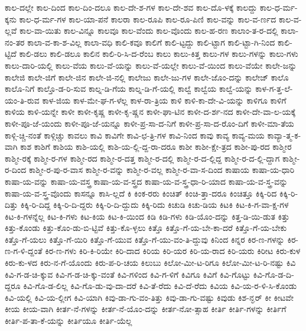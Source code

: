 {ಕಾಲ-ದಲ್ಲೇ
ಕಾಲ-ದಿಂದ
ಕಾಲ-ದಿಂ-ದಲೂ
ಕಾಲ-ದೇ-ಶ-ಗಳ
ಕಾಲ-ದೇ-ಶವ
ಕಾಲ-ದೊ-ಳಕ್ಕೆ
ಕಾಲದ್ದು
ಕಾಲ-ಧ-ರ್ಮ-ಕ್ಕನು
ಕಾಲ-ಧ-ರ್ಮ-ಗಳ
ಕಾಲ-ಯಾ-ಪನೆ
ಕಾಲರಾ
ಕಾಲ-ರೂಪಿ
ಕಾಲ-ರೂ-ಪಿಣಿ
ಕಾಲ-ವನ್ನು
ಕಾಲ-ವ-ರ್ಣದ
ಕಾಲ-ವ-ಲ್ಲವೆ
ಕಾಲ-ವಾ-ಯಿತು
ಕಾಲ-ವಿನ್ನೂ
ಕಾಲವೂ
ಕಾಲ-ವೆಂದು
ಕಾಲ-ವೊಂದು
ಕಾಲ-ಹ-ರಣ
ಕಾಲಾಂ-ತ-ರ-ದಲ್ಲಿ
ಕಾಲಾ-ನಂ-ತರ
ಕಾಲಾ-ವ-ಕಾ-ಶ-ವಿಲ್ಲ
ಕಾಲಾ-ವಧಿ
ಕಾಲಿ-ಕವೂ
ಕಾಲಿಗೆ
ಕಾಲಿ-ಟ್ಟದ್ದು
ಕಾಲಿ-ಟ್ಟಾಗ
ಕಾಲಿ-ಟ್ಟಾ-ಗಿ-ನಿಂದ
ಕಾಲಿ-ಟ್ಟಿದೆ
ಕಾಲಿ-ಡಲು
ಕಾಲಿ-ಡಲೂ
ಕಾಲಿನ
ಕಾಲಿ-ರಿ-ಸಿ-ದ-ರೆಂಬ
ಕಾಲು
ಕಾಲು-ಕಿತ್ತ
ಕಾಲು-ಗಳ
ಕಾಲು-ಗಳನ್ನು
ಕಾಲು-ಗಳು
ಕಾಲು-ದಾರಿ-ಯಲ್ಲಿ
ಕಾಲು-ವೆಯ
ಕಾಲು-ವೆ-ಯನ್ನು
ಕಾಲು-ವೆ-ಯಲ್ಲೇ
ಕಾಲು-ವೆ-ಯಿಂದ
ಕಾಲು-ವೆಯೇ
ಕಾಲೇ-ಜನ್ನು
ಕಾಲೇಜಿ
ಕಾಲೇ-ಜಿಗೆ
ಕಾಲೇ-ಜಿನ
ಕಾಲೇ-ಜಿ-ನಲ್ಲಿ
ಕಾಲೇಜು
ಕಾಲೇ-ಜು-ಗಳ
ಕಾಲೇ-ಜೊಂ-ದನ್ನು
ಕಾಲೇಜ್
ಕಾಲೊ
ಕಾಲೊ-ನಿಗೆ
ಕಾಲ್ತೊ-ಡ-ರಿ-ಸುವ
ಕಾಲ್ನ-ಡಿ-ಗೆಯ
ಕಾಲ್ನ-ಡಿ-ಗೆ-ಯಲ್ಲಿ
ಕಾಲ್ವೆ
ಕಾಲ್ವೆಯ
ಕಾಲ್ವೆ-ಯನ್ನು
ಕಾಳ-ಗ-ತ್ತ-ಲೆ-ಯಂ-ತಿ-ರುವ
ಕಾಳ-ಜಿಯ
ಕಾಳ-ಮೇ-ಘ-ಗ-ಳೆಲ್ಲ
ಕಾಳ-ರಾ-ತ್ರಿಯ
ಕಾಳಿ
ಕಾಳಿ-ಕಾ-ದೇ-ವಿ-ಯನ್ನು
ಕಾಳಿಗೂ
ಕಾಳಿಗೆ
ಕಾಳಿಯ
ಕಾಳಿ-ಯನ್ನೇ
ಕಾಳೀ
ಕಾಳೀ-ಕೃಷ್ಣ
ಕಾಳೀ-ಕೃ-ಷ್ಣನ
ಕಾಳೀ-ಘಾ-ಟಿನ
ಕಾಳೀ-ದ-ರ್ಶ-ನದ
ಕಾಳೀ-ದೇ-ವಾ-ಲ-ಯಕ್ಕೆ
ಕಾಳೀ-ಪೂ-ಜೆ-ಯಂದು
ಕಾಳೀ-ಪೂ-ಜೆ-ಯನ್ನೂ
ಕಾಳೀ-ಪ್ರ-ಸಾ-ದ-ನಿಗೆ
ಕಾಳೀ-ಪ್ರ-ಸಾ-ದ-ರೊಂ-ದಿಗೆ
ಕಾಳೀ-ಮಾ-ತೆಯ
ಕಾಳ್ಗಿ-ಚ್ಚಿ-ನಂತೆ
ಕಾಳ್ಗಿಚ್ಚು
ಕಾವಲು
ಕಾವಿ
ಕಾವಿಗೇ
ಕಾವಿ-ಛ-ತ್ರಿ-ಗಳ
ಕಾವಿ-ನಿಂದ
ಕಾವು
ಕಾವ್ಯ
ಕಾವ್ಯ-ಮಯ
ಕಾವ್ಯಾ-ತ್ಮ-ಕ-ವಾಗಿ
ಕಾಶ
ಕಾಶಿಗೆ
ಕಾಶಿಯ
ಕಾಶಿ-ಯಲ್ಲಿ
ಕಾಶಿ-ಯ-ಲ್ಲಿ-ದ್ದ-ರಾ-ದರೂ
ಕಾಶೀ
ಕಾಶೀ-ಕ್ಷೇ-ತ್ರದ
ಕಾಶೀ-ಪು-ರದ
ಕಾಶ್ಮೀರ
ಕಾಶ್ಮೀ-ರಕ್ಕೆ
ಕಾಶ್ಮೀ-ರ-ಗಳ
ಕಾಶ್ಮೀ-ರದ
ಕಾಶ್ಮೀ-ರ-ದತ್ತ
ಕಾಶ್ಮೀ-ರ-ದಲ್ಲಿ
ಕಾಶ್ಮೀ-ರ-ದ-ಲ್ಲಿದ್ದ
ಕಾಶ್ಮೀ-ರ-ದ-ಲ್ಲಿ-ದ್ದಾಗ
ಕಾಶ್ಮೀ-ರ-ದಿಂದ
ಕಾಶ್ಮೀ-ರ-ಪು-ರ-ವಾಸ
ಕಾಶ್ಮೀ-ರ-ವನ್ನು
ಕಾಶ್ಮೀ-ರ-ವಲ್ಲ
ಕಾಶ್ಮೀ-ರ-ವಾ-ಸ-ದಿಂದ
ಕಾಷಾಯ
ಕಾಷಾ-ಯ-ಧಾರಿ
ಕಾಷಾ-ಯ-ವನ್ನು
ಕಾಷಾ-ಯ-ವಸ್ತ್ರ
ಕಾಷಾ-ಯ-ವ-ಸ್ತ್ರದ
ಕಾಷಾ-ಯ-ವ-ಸ್ತ್ರ-ಧಾ-ರಿ-ಯಾದ
ಕಾಷಾ-ಯ-ವ-ಸ್ತ್ರ-ವನ್ನು
ಕಾಷಾ-ಯ-ವ-ಸ್ತ್ರ-ವೊಂದು
ಕಾಸನ್ನೂ
ಕಾಸಿ-ಲ್ಲದೆ
ಕಿ
ಕಿಂಕ-ರರು
ಕಿಂಚಿತ್
ಕಿಂಚಿ-ತ್ತಾ-ದರೂ
ಕಿಂಚಿತ್ತೂ
ಕಿಕ್ಕಿ-ರಿದ
ಕಿಕ್ಕಿ-ರಿ-ದಿತ್ತು
ಕಿಕ್ಕಿ-ರಿ-ದಿದ್ದ
ಕಿಕ್ಕಿ-ರಿ-ದಿ-ದ್ದರು
ಕಿಕ್ಕಿ-ರಿ-ದಿ-ದ್ದುದು
ಕಿಕ್ಕಿ-ರಿದು
ಕಿಚುಡಿ
ಕಿಚು-ಡಿಯ
ಕಿಟಕಿ
ಕಿಟ-ಕಿ-ಗ-ವಾ-ಕ್ಷ-ಗಳ
ಕಿಟ-ಕಿ-ಗಳನ್ನೆಲ್ಲ
ಕಿಟ-ಕಿ-ಗಳು
ಕಿಟ-ಕಿಯ
ಕಿಟ-ಕಿ-ಯಿಂದ
ಕಿಡಿ
ಕಿಡಿ-ಗಳು
ಕಿಡಿ-ಯೊಂ-ದನ್ನು
ಕಿತ್ತ-ಡಿ-ಯಿ-ಡುತ
ಕಿತ್ತು
ಕಿತ್ತು-ಕೊಂಡು
ಕಿತ್ತು-ಕೊಂ-ಡು-ಬಿ-ಟ್ಟಿವೆ
ಕಿತ್ತು-ಕೊ-ಳ್ಳಲು
ಕಿತ್ತೊ
ಕಿತ್ತೊ-ಗೆ-ಯ-ಬೇ-ಕಾ-ದರೆ
ಕಿತ್ತೊ-ಗೆ-ಯ-ಬೇಕು
ಕಿತ್ತೊ-ಗೆ-ಯಲು
ಕಿತ್ತೊ-ಗೆ-ಯಿರಿ
ಕಿತ್ತೊ-ಗೆ-ಯುವ
ಕಿತ್ತೊ-ಗೆ-ಯು-ವಂ-ತಿ-ದ್ದುವು
ಕಿನಿಂದ
ಕಿನ್ನರ
ಕಿರ-ಣ-ಗಳನ್ನು
ಕಿರ-ಣ-ಗ-ಳಿ-ದ್ದಂತೆ
ಕಿರ-ಣ-ಗಳು
ಕಿರಿ-ಕಿ-ರಿಯೇ
ಕಿರಿ-ದಾದ
ಕಿರಿಯ
ಕಿರಿ-ಯರ
ಕಿರಿ-ಯ-ರಾದ
ಕಿರಿ-ಯರು
ಕಿರೀಟ
ಕಿರು-ಕುಳ
ಕಿರು-ಕು-ಳದ
ಕಿರು-ನ-ಗೆ-ಯೊಂದು
ಕಿರು-ಪ-ರಿ-ಚಯ
ಕಿಲುಬು
ಕಿಲೋ-ಮೀ-ಟ-ರಿಗೂ
ಕಿಲೋ-ಮೀ-ಟ-ರಿ-ನಷ್ಟು
ಕಿವಿ
ಕಿವಿ-ಗ-ಡ-ಚಿ-ಕ್ಕುವ
ಕಿವಿ-ಗ-ಡ-ಚಿ-ಕ್ಕು-ವಂತೆ
ಕಿವಿ-ಗಳಿಂದ
ಕಿವಿ-ಗ-ಳಿಗೆ
ಕಿವಿಗೂ
ಕಿವಿಗೆ
ಕಿವಿ-ಗೊಟ್ಟು
ಕಿವಿ-ಗೊ-ಡ-ದಿ-ದ್ದರೂ
ಕಿವಿ-ಗೊ-ಡ-ಲಿಲ್ಲ
ಕಿವಿ-ಗೊ-ಡು-ವು-ದಾ-ದರೆ
ಕಿವಿ-ತೆ-ರೆದು
ಕಿವಿ-ದೆ-ರೆದು
ಕಿವಿಯ
ಕಿವಿ-ಯ-ರ-ಳಿ-ಸಿ-ಕೊಂಡು
ಕಿವಿ-ಯಲ್ಲಿ
ಕಿವಿ-ಯ-ಲ್ಲೀಗ
ಕಿವಿ-ಯಾಗಿ
ಕಿವು-ಡಾ-ಗು-ವಂ-ತಿತ್ತು
ಕಿವು-ಡಾ-ಗು-ವಷ್ಟು
ಕಿವುಡು
ಕಿಶ-ನ್ಘರ್
ಕೀ
ಕೀಟವೇ
ಕೀಯ
ಕೀಯ-ವಾಗಿ
ಕೀರ್ತ-ನೆ-ಗಳನ್ನು
ಕೀರ್ತ-ನೆ-ಯೊಂ-ದನ್ನು
ಕೀರ್ತ-ನೋ-ತ್ಸಾಹ
ಕೀರ್ತಿ
ಕೀರ್ತಿ-ಗಳನ್ನು
ಕೀರ್ತಿಗೆ
ಕೀರ್ತಿ-ಪ-ತಾ-ಕೆ-ಯನ್ನು
ಕೀರ್ತಿಯೂ
ಕೀರ್ತಿ-ಯೆಲ್ಲ
}
